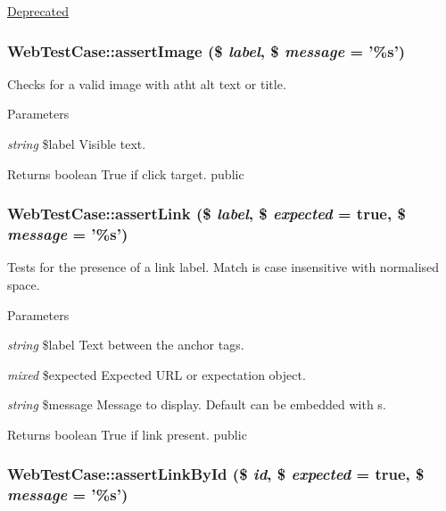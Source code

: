 \label{class_web_test_case_ae5e82c9a2219c4aa1d65d42b8a7286a0}
\begin{Desc}
\item[\hyperlink{deprecated__deprecated000024}{Deprecated}]\end{Desc}
\hypertarget{class_web_test_case_a657a5b3135189f9e9db563a76dce9329}{
\subsubsection[{assertImage}]{\setlength{\rightskip}{0pt plus 5cm}WebTestCase::assertImage (\$ {\em label}, \/  \$ {\em message} = {\ttfamily '\%s'})}}
\label{class_web_test_case_a657a5b3135189f9e9db563a76dce9329}
Checks for a valid image with atht alt text or title. 
\begin{DoxyParams}{Parameters}
\item[{\em string}]\$label Visible text. \end{DoxyParams}
\begin{DoxyReturn}{Returns}
boolean True if click target.  public 
\end{DoxyReturn}
\hypertarget{class_web_test_case_ae44bbb204f6496039507a06361f05431}{
\subsubsection[{assertLink}]{\setlength{\rightskip}{0pt plus 5cm}WebTestCase::assertLink (\$ {\em label}, \/  \$ {\em expected} = {\ttfamily true}, \/  \$ {\em message} = {\ttfamily '\%s'})}}
\label{class_web_test_case_ae44bbb204f6496039507a06361f05431}
Tests for the presence of a link label. Match is case insensitive with normalised space. 
\begin{DoxyParams}{Parameters}
\item[{\em string}]\$label Text between the anchor tags. \item[{\em mixed}]\$expected Expected URL or expectation object. \item[{\em string}]\$message Message to display. Default can be embedded with s. \end{DoxyParams}
\begin{DoxyReturn}{Returns}
boolean True if link present.  public 
\end{DoxyReturn}
\hypertarget{class_web_test_case_ab2edabae7160d6b9646de3c366b7c640}{
\subsubsection[{assertLinkById}]{\setlength{\rightskip}{0pt plus 5cm}WebTestCase::assertLinkById (\$ {\em id}, \/  \$ {\em expected} = {\ttfamily true}, \/  \$ {\em message} = {\ttfamily '\%s'})}}

